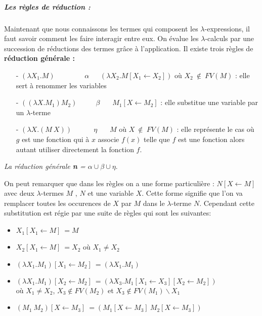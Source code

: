 \documentclass[10pt,a4paper]{report}
\begin{document}
\subparagraph{Les règles de réduction :}
Maintenant que nous connaissons les termes qui composent les $\lambda$-expressions, il faut savoir
comment les faire interagir entre eux. On évalue les $\lambda$-calculs par une succession de réductions des termes grâce à
l'application. Il existe trois règles de \textbf{réduction générale :}
\begin{itemize}
\item[-] $(\lambda X_{1}.M)~~~~~~~~~~~~~~~~~~~\alpha~~~~~~~(\lambda X_{2}.M[X_{1} \leftarrow X_{2}])$
  où $X_{2}~\notin~FV(M)$ : elle sert à renommer les variables
\item[-] $((\lambda X.M_{1})M_{2})~~~~~~~~~~~~\beta~~~~~~~~M_{1}[X \leftarrow M_{2}]$ : elle substitue une variable par un $\lambda$-terme
\item[-] $(\lambda X.(M~X))~~~~~~~~~~~~~~\eta~~~~~~~~M$ 
  où $X~\notin~FV(M)$ : elle représente le cas où $g$ est une fonction qui à $x$ associe $f(x)$  telle que $f$ est une fonction
  alors autant utiliser directement la fonction $f$.
\end{itemize}
\medbreak

\textit{La réduction générale \textbf{n} = $\alpha \cup \beta \cup \eta$}.
\bigbreak


On peut remarquer que dans les règles on a une forme particulière : $N [X \leftarrow M]$ avec deux $\lambda$-termes $M$ ,
$N$ et une variable $X$. Cette forme signifie que l'on va remplacer toutes les occurences de $X$ par $M$ dans le $\lambda$-terme $N$.
Cependant cette substitution est régie par une suite de règles qui sont les suivantes: 
\begin{itemize}
\item $X_{1}[X_{1} \leftarrow M]~= M$
\item $X_{2}[X_{1} \leftarrow M]~= X_{2}$ où $X_{1}\neq X_{2}$
\item $(\lambda X_{1}.M_{1})[X_{1} \leftarrow M_{2}]~= (\lambda X_{1}.M_{1})$
\item $(\lambda X_{1}.M_{1})[X_{2} \leftarrow M_{2}]~= (\lambda X_{3}.M_{1}[X_{1} \leftarrow X_{3}][X_{2} \leftarrow M_{2}])$ 
  \\où $X_{1} \neq X_{2}$, $X_{3} \notin FV(M_{2})$ et $X_{3} \notin FV(M_{1})\backslash{X_{1}}$ 
\item $(M_{1}~M_{2})[X \leftarrow M_{3}]~=(M_{1}[X \leftarrow M_{3}]~M_{2}[X \leftarrow M_{3}])$
\end{itemize}
\bigbreak
\end{document}
